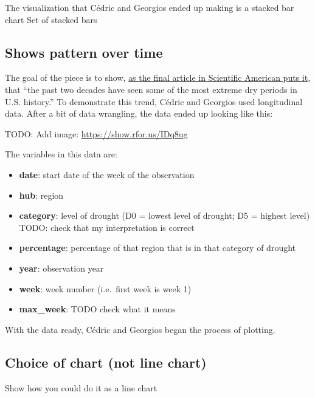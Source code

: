 \documentclass[
]{book}
\providecommand{\tightlist}{%
  \setlength{\itemsep}{0pt}\setlength{\parskip}{0pt}}
\begin{document}
The visualization that Cédric and Georgios ended up making is a stacked bar chart
Set of stacked bars

\hypertarget{shows-pattern-over-time}{%
\subsection{Shows pattern over time}\label{shows-pattern-over-time}}

The goal of the piece is to show, \href{https://www.scientificamerican.com/article/climate-change-drives-escalating-drought/}{as the final article in Scientific American puts it}, that ``the past two decades have seen some of the most extreme dry periods in U.S. history.'' To demonstrate this trend, Cédric and Georgios used longitudinal data. After a bit of data wrangling, the data ended up looking like this:

TODO: Add image: \url{https://show.rfor.us/IDq8ug}

The variables in this data are:

\begin{itemize}
\tightlist
\item
  \textbf{date}: start date of the week of the observation
\item
  \textbf{hub}: region
\item
  \textbf{category}: level of drought (D0 = lowest level of drought; D5 = highest level) TODO: check that my interpretation is correct
\item
  \textbf{percentage}: percentage of that region that is in that category of drought
\item
  \textbf{year}: observation year
\item
  \textbf{week}: week number (i.e.~first week is week 1)
\item
  \textbf{max\_week}: TODO check what it means
\end{itemize}

With the data ready, Cédric and Georgios began the process of plotting.

\hypertarget{choice-of-chart-not-line-chart}{%
\subsection{Choice of chart (not line chart)}\label{choice-of-chart-not-line-chart}}

Show how you could do it as a line chart
\end{document}
